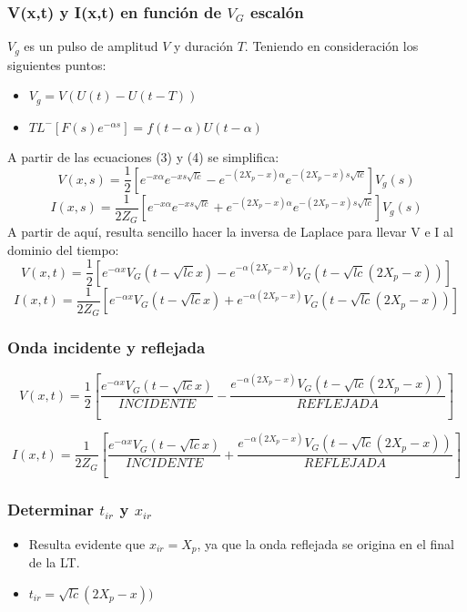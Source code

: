 \documentclass[12pt]{article}
\begin{document}
\subsubsection{V(x,t) y I(x,t) en función de ${V}_{G}$ escalón}
${V}_{g}$ es un pulso de amplitud ${V}$ y duración ${T}$.
Teniendo en consideración los siguientes puntos:
\begin{itemize}
	\item ${V}_{g}=V(U(t)-U(t-T))$
	\item ${TL}^{-}[F(s){e}^{-\alpha s}]=f(t-\alpha)U(t-\alpha)$
\end{itemize}
A partir de las ecuaciones (3) y (4) se simplifica:
\begin{equation}
V(x,s)= \frac{1}{2}[{e}^{-x\alpha}{e}^{-xs\sqrt{lc}} - {e}^{-(2{X}_{p}-x)\alpha} {e}^{-(2{X}_{p}-x)s\sqrt{lc}}]{V}_{g}(s)
\end{equation}
\begin{equation}
I(x,s)= \frac{1}{2{Z}_{G}}[{e}^{-x\alpha}{e}^{-xs\sqrt{lc}} + {e}^{-(2{X}_{p}-x)\alpha} {e}^{-(2{X}_{p}-x)s\sqrt{lc}}]{V}_{g}(s)
\end{equation}
A partir de aquí, resulta sencillo hacer la inversa de Laplace para llevar V e I al dominio del tiempo:
\begin{equation}
V(x,t)= \frac{1}{2}[{e}^{-\alpha x}{V}_{G}(t-\sqrt{lc}x) - {e}^{-\alpha(2{X}_{p}-x)} {V}_{G}(t-\sqrt{lc}(2{X}_{p}-x))]
\end{equation}
\begin{equation}
I(x,t)= \frac{1}{2{Z}_{G}}[{e}^{-\alpha x}{V}_{G}(t-\sqrt{lc}x) + {e}^{-\alpha(2{X}_{p}-x)} {V}_{G}(t-\sqrt{lc}(2{X}_{p}-x))]
\end{equation}
\subsubsection{Onda incidente y reflejada}
\begin{displaymath}
V(x,t)= \frac{1}{2}[\frac{{e}^{-\alpha x}{V}_{G}(t-\sqrt{lc}x)}{INCIDENTE} - \frac{{e}^{-\alpha(2{X}_{p}-x)} {V}_{G}(t-\sqrt{lc}(2{X}_{p}-x))}{REFLEJADA}]
\end{displaymath}

\begin{displaymath}
I(x,t)= \frac{1}{2{Z}_{G}}[\frac{{e}^{-\alpha x}{V}_{G}(t-\sqrt{lc}x)}{INCIDENTE} + \frac{{e}^{-\alpha(2{X}_{p}-x)} {V}_{G}(t-\sqrt{lc}(2{X}_{p}-x))}{REFLEJADA}]
\end{displaymath}

\subsubsection{Determinar ${t}_{ir}$ y ${x}_{ir}$}
\begin{itemize}
\item Resulta evidente que ${x}_{ir}={X}_{p}$, ya que la onda reflejada se origina en el final de la LT.
\item ${t}_{ir}= \sqrt{lc}(2{X}_{p}-x))$ 
\end{itemize}
\end{document}
